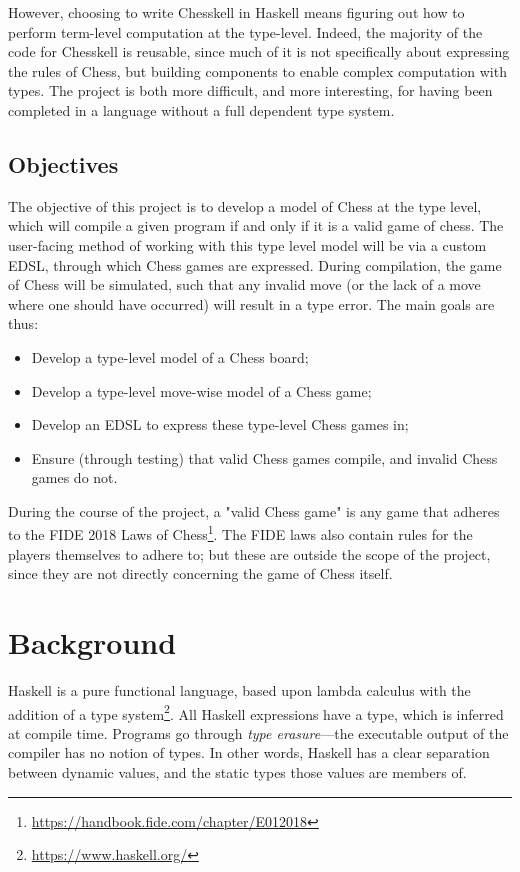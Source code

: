 \documentclass[12pt, a4paper, bibliography=totocnumbered]{scrreprt}
\begin{document}
However, choosing to write Chesskell in Haskell means figuring out how to perform term-level computation at the type-level. Indeed, the majority of the code for Chesskell is reusable, since much of it is not specifically about expressing the rules of Chess, but building components to enable complex computation with types. The project is both more difficult, and more interesting, for having been completed in a language without a full dependent type system.

\section{Objectives}

The objective of this project is to develop a model of Chess at the type level, which will compile a given program if and only if it is a valid game of chess. The user-facing method of working with this type level model will be via a custom EDSL, through which Chess games are expressed. During compilation, the game of Chess will be simulated, such that any invalid move (or the lack of a move where one should have occurred) will result in a type error. The main goals are thus:

\begin{itemize}
    \item Develop a type-level model of a Chess board;
    \item Develop a type-level move-wise model of a Chess game;
    \item Develop an EDSL to express these type-level Chess games in;
    \item Ensure (through testing) that valid Chess games compile, and invalid Chess games do not.
\end{itemize}

During the course of the project, a "valid Chess game" is any game that adheres to the FIDE 2018 Laws of Chess\footnote{\url{https://handbook.fide.com/chapter/E012018}}. The FIDE laws also contain rules for the players themselves to adhere to; but these are outside the scope of the project, since they are not directly concerning the game of Chess itself.


\chapter{Background}

Haskell is a pure functional language, based upon lambda calculus with the addition of a type system\footnote{\url{https://www.haskell.org/}}. All Haskell expressions have a type, which is inferred at compile time. Programs go through \emph{type erasure}---the executable output of the compiler has no notion of types. In other words, Haskell has a clear separation between dynamic values, and the static types those values are members of.
\end{document}
